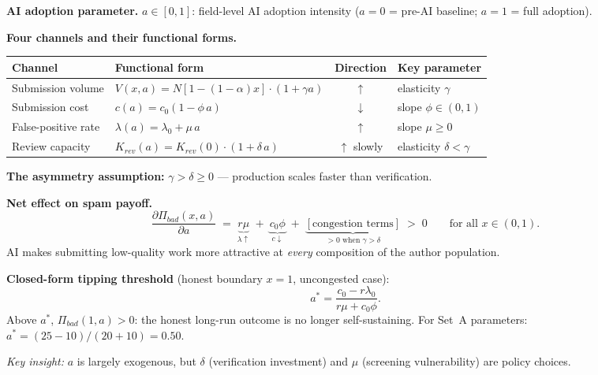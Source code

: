 \documentclass{article}
\begin{document}
\begin{tcolorbox}[boxstyle, title={Box S3\quad What AI Changes: Parameter Shifts and the Asymmetry}]
\small
\textbf{AI adoption parameter.}\;
$a\in[0,1]$: field-level AI adoption intensity ($a=0$ = pre-AI baseline; $a=1$ = full adoption).

\medskip
\textbf{Four channels and their functional forms.}\smallskip

\noindent
\begin{tabular}{@{}p{3.2cm}p{7.0cm}cl@{}}
\toprule
Channel & Functional form & Direction & Key parameter \\
\midrule
Submission volume    & $V(x,a)=N[1-(1-\alpha)x]\cdot(1+\gamma a)$ & $\uparrow$ & elasticity $\gamma$ \\
Submission cost      & $c(a)=c_0(1-\phi\, a)$                      & $\downarrow$ & slope $\phi\in(0,1)$ \\
False-positive rate  & $\lambda(a)=\lambda_0+\mu\, a$              & $\uparrow$ & slope $\mu\geq 0$ \\
Review capacity      & $K_{rev}(a)=K_{rev}(0)\cdot(1+\delta\, a)$  & $\uparrow$ slowly & elasticity $\delta<\gamma$ \\
\bottomrule
\end{tabular}

\medskip
\textbf{The asymmetry assumption:}\; $\gamma>\delta\geq 0$ --- production scales faster than verification.

\medskip
\textbf{Net effect on spam payoff.}
\[
  \frac{\partial\Pi_{bad}(x,a)}{\partial a}
  \;=\;\underbrace{r\mu}_{{\lambda\uparrow}}
  \;+\;\underbrace{c_0\phi}_{c\downarrow}
  \;+\;\underbrace{[\text{congestion terms}]}_{>0\text{ when }\gamma>\delta}
  \;>\;0
  \qquad\text{for all }x\in(0,1).
\]
AI makes submitting low-quality work more attractive at \emph{every} composition of the author population.

\medskip
\textbf{Closed-form tipping threshold} (honest boundary $x=1$, uncongested case):
\[
  a^{*}=\frac{c_0-r\lambda_0}{r\mu+c_0\phi}.
\]
Above $a^{*}$, $\Pi_{bad}(1,a)>0$: the honest long-run outcome is no longer self-sustaining.
For Set~A parameters: $a^{*}=(25-10)/(20+10)=0.50$.

\medskip
\textit{Key insight:}\; $a$ is largely exogenous, but $\delta$ (verification investment) and $\mu$ (screening vulnerability) are policy choices.
\end{tcolorbox}
\end{document}
